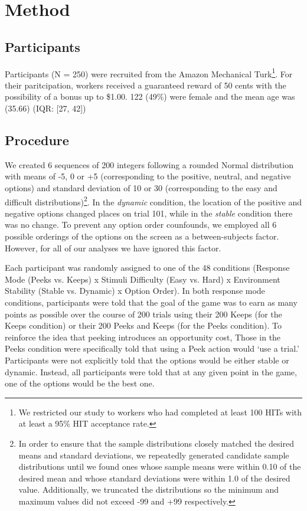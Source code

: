 \documentclass[a4paper,doc,natbib,floatsintext]{apa6}\usepackage[]{graphicx}\usepackage[]{color}
\begin{document}
\section{Method}

\subsection{Participants}

Participants (N = 250) were recruited from the Amazon Mechanical Turk\footnote{We restricted our study to workers who had completed at least 100 HITs with at least a 95\% HIT acceptance rate.}. For their paritcipation, workers received a guaranteed reward of 50 cents with the possibility of a bonus up to \$1.00. 122 (49\%) were female and the mean age was (35.66) (IQR: [27, 42])

\subsection{Procedure}

We created 6 sequences of 200 integers following a rounded Normal distribution with means of -5, 0 or +5 (corresponding to the positive, neutral, and negative options) and standard deviation of 10 or 30 (corresponding to the easy and difficult distributions)\footnote{In order to ensure that the sample distributions closely matched the desired means and standard deviations, we repeatedly generated candidate sample distributions until we found ones whose sample means were within 0.10 of the desired mean and whose standard deviations were within 1.0 of the desired value. Additionally, we truncated the distributions so the minimum and maximum values did not exceed -99 and +99 respectively.}. In the \textit{dynamic} condition, the location of the positive and negative options changed places on trial 101, while in the \textit{stable} condition there was no change. To prevent any option order counfounds, we employed all 6 possible orderings of the options on the screen as a between-subjects factor. However, for all of our analyses we have ignored this factor.

Each participant was randomly assigned to one of the 48 conditions (Response Mode (Peeks vs. Keeps) x Stimuli Difficulty (Easy vs. Hard) x Environment Stability (Stable vs. Dynamic) x Option Order). In both response mode conditions, participants were told that the goal of the game was to earn as many points as possible over the course of 200 trials using their 200 Keeps (for the Keeps condition) or their 200 Peeks and Keeps (for the Peeks condition). To reinforce the idea that peeking introduces an opportunity cost, Those in the Peeks condition were specifically told that using a Peek action would `use a trial.' Participants were not explicitly told that the options would be either stable or dynamic. Instead, all participants were told that at any given point in the game, one of the options would be the best one.
\end{document}
